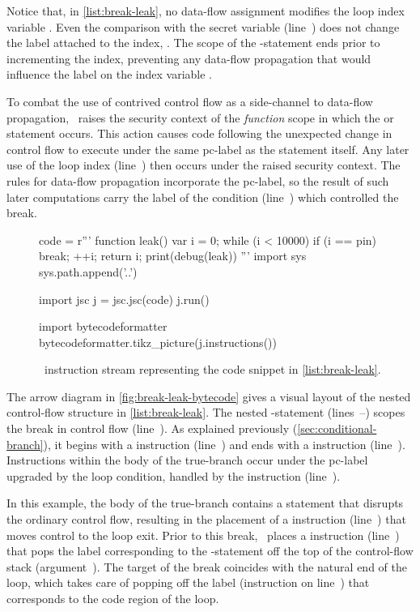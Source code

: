Notice that, in \autoref{list:break-leak}, no data-flow assignment modifies the loop index variable .
Even the comparison with the secret variable  (line~) does not change the label attached to the index, .
The scope of the -statement ends prior to incrementing the index, preventing any data-flow propagation that would influence the label on the index variable .

To combat the use of contrived control flow as a side-channel to data-flow propagation, \FlowCore\ raises the security context of the \emph{function} scope in which the  or  statement occurs.
This action causes code following the unexpected change in control flow to execute under the same pc-label as the  statement itself.
Any later use of the loop index  (line~) then occurs under the raised security context.
The rules for data-flow propagation incorporate the pc-label, so the result of such later computations carry the label of the condition (line~) which controlled the break.

\begin{figure}[h]
\begin{python}
code = r'''
function leak() {
  var i = 0;
  while (i < 10000) {
    if (i == pin)
      break;
    ++i;
  }
  return i;
}
print(debug(leak))
'''
import sys
sys.path.append('..')

import jsc
j = jsc.jsc(code)
j.run()

import bytecodeformatter
bytecodeformatter.tikz_picture(j.instructions())
\end{python}
  \caption{\FlowCore\ instruction stream representing the code snippet in \autoref{list:break-leak}.}
  \label{fig:break-leak-bytecode}
\end{figure}

The arrow diagram in \autoref{fig:break-leak-bytecode} gives a visual layout of the nested control-flow structure in \autoref{list:break-leak}.
The nested -statement (lines~--) scopes the break in control flow (line~).
As explained previously (\autoref{sec:conditional-branch}), it begins with a \dup instruction (line~) and ends with a \popj instruction (line~).
Instructions within the body of the true-branch occur under the pc-label upgraded by the loop condition, handled by the \join instruction (line~).

In this example, the body of the true-branch contains a  statement that disrupts the ordinary control flow, resulting in the placement of a  instruction (line~) that moves control to the loop exit.
Prior to this break, \FlowCore\ places a \popj instruction (line~) that pops the label corresponding to the -statement off the top of the control-flow stack (argument~).
The target of the break coincides with the natural end of the loop, which takes care of popping off the label (\popj instruction on line~) that corresponds to the code region of the loop.

